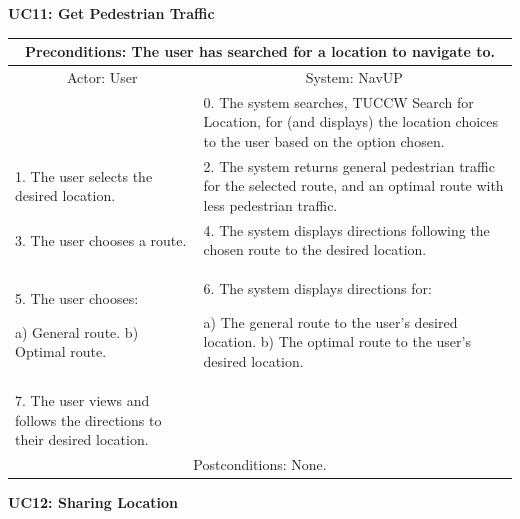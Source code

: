 \documentclass{article}
\begin{document}
				\vspace{5mm}
                \begin{flushleft}
                \textbf{UC11: Get Pedestrian Traffic}\\
                \end{flushleft}
        		\centering		
       		 \small
       		 \begin{tabular}{|p{6cm}|p{6cm}|}
       		 \hline
       		\multicolumn{2}{c}{ Preconditions: The user has searched for a location to navigate to.} \\
       		 \hline
       		\multicolumn{1}{c}{Actor: User} & \multicolumn{1}{c}{ System: NavUP} \\
        		\hline
       		  & 0.	The system searches, TUCCW Search for Location, for (and displays) the location choices to the user based on the option chosen.\\
       		 \hline
       		 1.	The user selects the desired location. & 2.	The system returns general pedestrian traffic for the selected route, and an optimal route with less pedestrian traffic.\\
        		\hline
       		 3.	The user chooses a route. & 4.	The system displays directions following the chosen route to the desired location.\\
        		\hline
       		 5.	The user chooses:

						a)	General route.
						b)	Optimal route.
			 & 6.	The system displays directions for:

					a)	The general route to the user's desired location.
					b)	The optimal route to the user's desired location.
 \\
        		\hline
        		7.	The user views and follows the directions to their desired location. & \\
       		 \hline
        		\multicolumn{2}{c}{Postconditions: None.} \\
        		\hline
        \end{tabular} 
\newpage
				\vspace{5mm}
                \begin{flushleft}
                \textbf{UC12: Sharing Location}\\
                \end{flushleft}
        		\centering		
       		 \small
\end{document}
